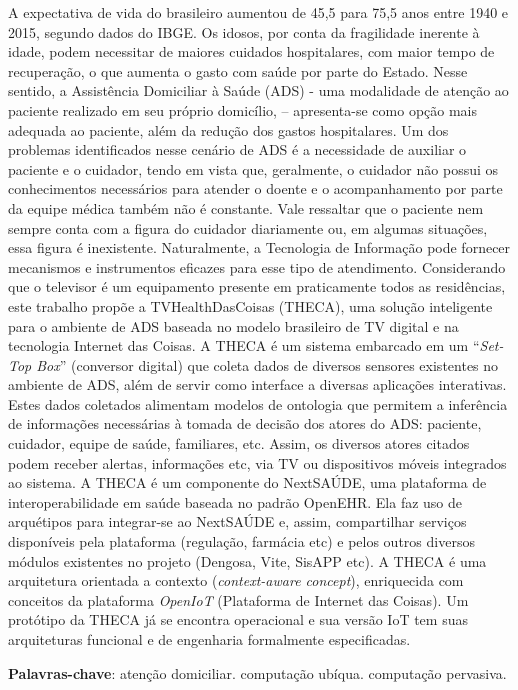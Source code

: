 \setlength{\absparsep}{18pt} %
\begin{resumo}

A expectativa de vida do brasileiro aumentou de 45,5 para 75,5 anos entre 1940 e
2015, segundo dados do IBGE. Os idosos, por conta da fragilidade inerente à
idade, podem necessitar de maiores cuidados hospitalares, com maior tempo de
recuperação, o que aumenta o gasto com saúde por parte do Estado. Nesse sentido,
a Assistência Domiciliar à Saúde (ADS) - uma modalidade de atenção ao paciente
realizado em seu próprio domicílio, – apresenta-se como opção mais adequada ao
paciente, além da redução dos gastos hospitalares. Um dos problemas
identificados nesse cenário de ADS é a necessidade de auxiliar o paciente e o
cuidador, tendo em vista que, geralmente, o cuidador não possui os conhecimentos
necessários para atender o doente e o acompanhamento por parte da equipe médica
também não é  constante. Vale ressaltar que o paciente nem sempre conta com a
figura do cuidador diariamente ou, em algumas situações, essa figura é
inexistente. Naturalmente, a Tecnologia de Informação pode fornecer mecanismos e
instrumentos eficazes para esse tipo de atendimento. Considerando que o
televisor é um equipamento presente em praticamente todos as residências, este
trabalho propõe a TVHealthDasCoisas (THECA), uma solução inteligente para o
ambiente de ADS baseada no modelo brasileiro de TV digital e na tecnologia
Internet das Coisas. A THECA é um sistema embarcado em um ``\textit{Set-Top
Box}'' (conversor digital) que coleta dados de diversos sensores existentes no
ambiente de ADS, além de servir como interface a diversas aplicações
interativas. Estes dados coletados alimentam modelos de ontologia que permitem a
inferência de informações necessárias à tomada de decisão dos atores do ADS:
paciente, cuidador, equipe de saúde, familiares, etc. Assim, os diversos atores
citados podem receber alertas, informações etc, via TV ou dispositivos móveis
integrados ao sistema. A THECA é um componente do NextSAÚDE, uma plataforma de
interoperabilidade em saúde baseada no padrão OpenEHR. Ela faz uso de arquétipos
para integrar-se ao NextSAÚDE e, assim, compartilhar serviços disponíveis pela
plataforma (regulação, farmácia etc) e pelos outros diversos módulos existentes
no projeto (Dengosa, Vite, SisAPP etc). A THECA é uma arquitetura orientada a
contexto (\textit{context-aware concept}), enriquecida com conceitos da
plataforma \textit{OpenIoT} (Plataforma de Internet das Coisas). Um protótipo da
THECA já se encontra operacional e sua versão IoT tem suas arquiteturas
funcional e de engenharia formalmente especificadas.

 \textbf{Palavras-chave}: atenção domiciliar. computação ubíqua. computação pervasiva.
 \end{resumo}
